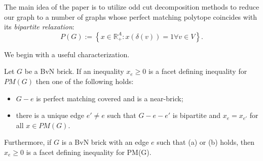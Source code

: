 \documentclass[10pt,a4paper]{amsart}
\newcommand{\R}{\mathbb{R}}
\begin{document}
The main idea of the paper is to utilize odd cut decomposition methods to reduce our graph to a number of graphs whose perfect matching polytope coincides with its \emph{bipartite relaxation}:\begin{equation}\label{eq:pm-bipartite}
    P(G):=\left\{x\in \R^A_{+}: x(\delta(v))= 1  \forall v\in V \right\}.
\end{equation} 

We begin with a useful characterization. \begin{theorem}\label{thm:facet-nonbip}
    Let $G$ be a BvN brick. If an inequality $x_e\geq 0$ is a facet defining inequality for $PM(G)$ then one of the following holds: \begin{itemize}
        \item[(a)] $G-e$ is perfect matching covered and is a near-brick;
        \item[(b)] there is a unique edge $e'\neq e$ such that $G-e-e'$ is bipartite and $x_e = x_{e'}$ for all $x \in PM(G)$.
    \end{itemize}
    Furthermore, if $G$ is a BvN brick with an edge $e$ such that (a) or (b) holds, then $x_e\geq 0$ is a facet defining inequality for PM(G).
\end{theorem}
\end{document}
